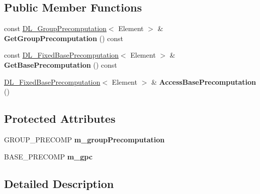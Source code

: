\subsection*{Public Member Functions}
\begin{DoxyCompactItemize}
\item 
\hypertarget{class_d_l___group_parameters_impl_a2c1f1f5f911584b6b94f5c9b5b0a9c20}{
const \hyperlink{class_d_l___group_precomputation}{DL\_\-GroupPrecomputation}$<$ Element $>$ \& {\bfseries GetGroupPrecomputation} () const }
\label{class_d_l___group_parameters_impl_a2c1f1f5f911584b6b94f5c9b5b0a9c20}

\item 
\hypertarget{class_d_l___group_parameters_impl_a0fd185910bdd3bedc7c26102c61ce903}{
const \hyperlink{class_d_l___fixed_base_precomputation}{DL\_\-FixedBasePrecomputation}$<$ Element $>$ \& {\bfseries GetBasePrecomputation} () const }
\label{class_d_l___group_parameters_impl_a0fd185910bdd3bedc7c26102c61ce903}

\item 
\hypertarget{class_d_l___group_parameters_impl_ae697d28fa013dd60f78b943cdd4fa973}{
\hyperlink{class_d_l___fixed_base_precomputation}{DL\_\-FixedBasePrecomputation}$<$ Element $>$ \& {\bfseries AccessBasePrecomputation} ()}
\label{class_d_l___group_parameters_impl_ae697d28fa013dd60f78b943cdd4fa973}

\end{DoxyCompactItemize}
\subsection*{Protected Attributes}
\begin{DoxyCompactItemize}
\item 
\hypertarget{class_d_l___group_parameters_impl_a9b4bc35a5e9a03d1ff075abefe8d045c}{
GROUP\_\-PRECOMP {\bfseries m\_\-groupPrecomputation}}
\label{class_d_l___group_parameters_impl_a9b4bc35a5e9a03d1ff075abefe8d045c}

\item 
\hypertarget{class_d_l___group_parameters_impl_a187f7e42228ffcfd25ce90c35b979561}{
BASE\_\-PRECOMP {\bfseries m\_\-gpc}}
\label{class_d_l___group_parameters_impl_a187f7e42228ffcfd25ce90c35b979561}

\end{DoxyCompactItemize}


\subsection{Detailed Description}
